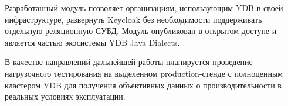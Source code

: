 \documentclass[times]{itmo-student-thesis}
\begin{document}
Разработанный модуль позволяет организациям, использующим YDB в своей инфраструктуре,
развернуть Keycloak без необходимости поддерживать отдельную реляционную СУБД.
Модуль опубликован в открытом доступе и является частью экосистемы YDB Java Dialects.

В качестве направлений дальнейшей работы планируется проведение нагрузочного
тестирования на выделенном production-стенде с полноценным кластером YDB
для получения объективных данных о производительности в реальных условиях эксплуатации.

\nocite{*}
\printmainbibliography

\appendix
\end{document}
